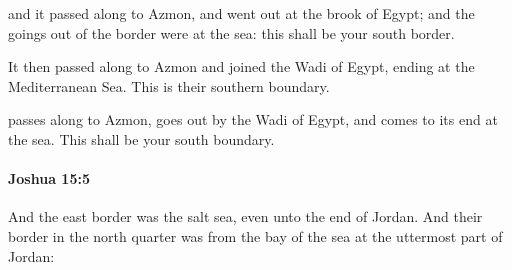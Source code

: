 			\begin{versebox}
					\item[BHS] 
					\item[ASV] and it passed along to Azmon, and went out at the brook of Egypt; and the goings out of the border were at the sea: this shall be your south border.
					\item[NIV] It then passed along to Azmon and joined the Wadi of Egypt, ending at the Mediterranean Sea. This is their southern boundary.
					\item[NRSV] passes along to Azmon, goes out by the Wadi of Egypt, and comes to its end at the sea. This shall be your south boundary.
			\end{versebox}

		\paragraph{Joshua 15:5} %
			\label{JOSHUA-15-5}

			And the east border was the salt sea, even unto the end of Jordan. And their border in the north quarter was from the bay of the sea at the uttermost part of Jordan:

